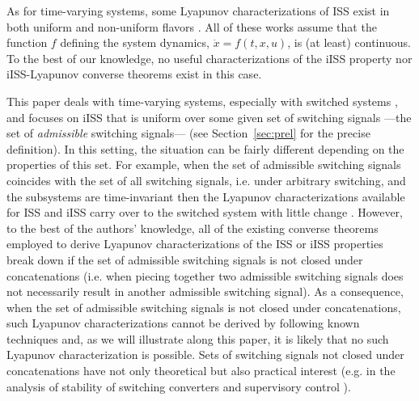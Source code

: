 \documentclass[9pt,final,journal]{IEEEtran}
\begin{document}
As for time-varying systems, some Lyapunov characterizations of ISS exist in both uniform \cite{edwlin_cdc00} and non-uniform flavors \cite{kartsi_tac04,linwan_ifacwc05}. All of these works assume that the function $f$ defining the system dynamics, $\dot x = f(t,x,u)$, is (at least) continuous. To the best of our knowledge, no useful characterizations of the iISS property nor iISS-Lyapunov converse theorems exist in this case.

This paper deals with time-varying systems, especially with switched systems \cite{liberzon_book03}, and focuses on iISS that is uniform over some given set of switching signals ---the set of \emph{admissible} switching signals--- (see Section~\ref{sec:prel} for the precise definition). In this setting, the situation can be fairly different depending on the properties of this set. For example, when the set of admissible switching signals coincides with the set of all switching signals, i.e. under arbitrary switching, and the subsystems are time-invariant then the Lyapunov characterizations available for ISS and iISS carry over to the switched system with little change \cite{mangar_scl00,mangar_scl01}. However, to the best of the authors' knowledge, all of the existing converse theorems employed to derive Lyapunov characterizations of the ISS or iISS properties break down if the set of admissible switching signals is not closed under concatenations (i.e. when piecing together two admissible switching signals does not necessarily result in another admissible switching signal). As a consequence, when the set of admissible switching signals is not closed under concatenations, such Lyapunov characterizations cannot be derived by following known techniques and, as we will illustrate along this paper, it is likely that no such Lyapunov characterization is possible. Sets of switching signals not closed under concatenations have not only theoretical but also practical interest (e.g. in the analysis of stability of switching converters \cite{denhai_auto16} and supervisory control \cite{liberzon_book03}).
\end{document}
